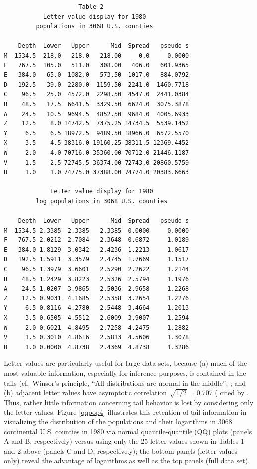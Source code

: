 \documentclass[oneside]{article}
\begin{document}
\begin{verbatim}
                     Table 2
           Letter value display for 1980
         populations in 3068 U.S. counties

    Depth  Lower   Upper      Mid  Spread   pseudo-s
M  1534.5  218.0   218.0   218.00     0.0     0.0000
F   767.5  105.0   511.0   308.00   406.0   601.9365
E   384.0   65.0  1082.0   573.50  1017.0   884.0792
D   192.5   39.0  2280.0  1159.50  2241.0  1460.7718
C    96.5   25.0  4572.0  2298.50  4547.0  2441.0384
B    48.5   17.5  6641.5  3329.50  6624.0  3075.3878
A    24.5   10.5  9694.5  4852.50  9684.0  4005.6933
Z    12.5    8.0 14742.5  7375.25 14734.5  5539.1452
Y     6.5    6.5 18972.5  9489.50 18966.0  6572.5570
X     3.5    4.5 38316.0 19160.25 38311.5 12369.4452
W     2.0    4.0 70716.0 35360.00 70712.0 21446.1187
V     1.5    2.5 72745.5 36374.00 72743.0 20860.5759
U     1.0    1.0 74775.0 37388.00 74774.0 20383.6663

             Letter value display for 1980
         log populations in 3068 U.S. counties

    Depth  Lower   Upper      Mid  Spread   pseudo-s
M  1534.5 2.3385  2.3385   2.3385  0.0000     0.0000
F   767.5 2.0212  2.7084   2.3648  0.6872     1.0189
E   384.0 1.8129  3.0342   2.4236  1.2213     1.0617
D   192.5 1.5911  3.3579   2.4745  1.7669     1.1517
C    96.5 1.3979  3.6601   2.5290  2.2622     1.2144
B    48.5 1.2429  3.8223   2.5326  2.5794     1.1976
A    24.5 1.0207  3.9865   2.5036  2.9658     1.2268
Z    12.5 0.9031  4.1685   2.5358  3.2654     1.2276
Y     6.5 0.8116  4.2780   2.5448  3.4664     1.2013
X     3.5 0.6505  4.5512   2.6009  3.9007     1.2594
W     2.0 0.6021  4.8495   2.7258  4.2475     1.2882
V     1.5 0.3010  4.8616   2.5813  4.5606     1.3078
U     1.0 0.0000  4.8738   2.4369  4.8738     1.3286
\end{verbatim}

Letter values are particularly useful for large data sets,
because (a) much of the most valuable information, especially
for inference purposes, is contained in the tails
(cf.~Winsor's principle, ``All distributions are normal
in the middle'';  \citep[457]{tukey60}; and (b) adjacent
letter values have asymptotic correlation $\sqrt{1/2}$ = 0.707
(\citep{mosteller46} cited by \citet[51--52]{dchlv}.
Thus, rather little information concerning tail behavior
is lost by considering only the letter values.  Figure \ref{qqpop4}
illustrates this retention of tail information in visualizing the
distribution of the populations and their logarithms
in 3068 continental U.S. counties in 1980 via
normal quantile-quantile (QQ) plots (panels A and B, respectively)
versus using only the 25 letter values shown in Tables 1 and 2 above
(panels C and D, respectively); the bottom panels (letter values only)
reveal the advantage of logarithms as well as the top panels (full data set).
\end{document}
